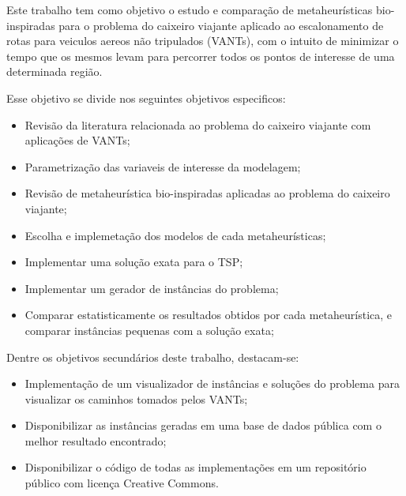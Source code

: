 \documentclass[
	12pt,				%
	openright,			%
	oneside,			%
	a4paper,			%
	chapter=TITLE,		%
	subsection=TITLE,	%
	english,			%
	brazil,				%
	]{abntex2}
\begin{document}

Este trabalho tem como objetivo o estudo e comparação de metaheurísticas bio-inspiradas para o problema do caixeiro viajante aplicado ao escalonamento de rotas para veiculos aereos não tripulados (VANTs), com o intuito de minimizar o tempo que os mesmos levam para percorrer todos os pontos de interesse de uma determinada região.

Esse objetivo se divide nos seguintes objetivos especificos: \begin{itemize}
	\item Revisão  da literatura relacionada ao problema do caixeiro viajante com aplicações de VANTs;
	\item Parametrização das variaveis de interesse da modelagem;
	\item Revisão de metaheurística bio-inspiradas aplicadas ao problema do caixeiro viajante;
	\item Escolha e implemetação dos modelos de cada metaheurísticas;
	\item Implementar uma solução exata para o TSP;
	\item Implementar um gerador de instâncias do problema;
	\item Comparar estatisticamente os resultados obtidos por cada metaheurística, e comparar instâncias pequenas com a solução exata;
\end{itemize}

Dentre os objetivos secundários deste trabalho, destacam-se: \begin{itemize}
	\item Implementação de um visualizador de instâncias e soluções do problema para visualizar os caminhos tomados pelos VANTs;
	\item Disponibilizar as instâncias geradas em uma base de dados pública com o melhor resultado encontrado;
	\item Disponibilizar o código de todas as implementações em um repositório público com licença Creative Commons.
\end{itemize}

%


\end{document}
